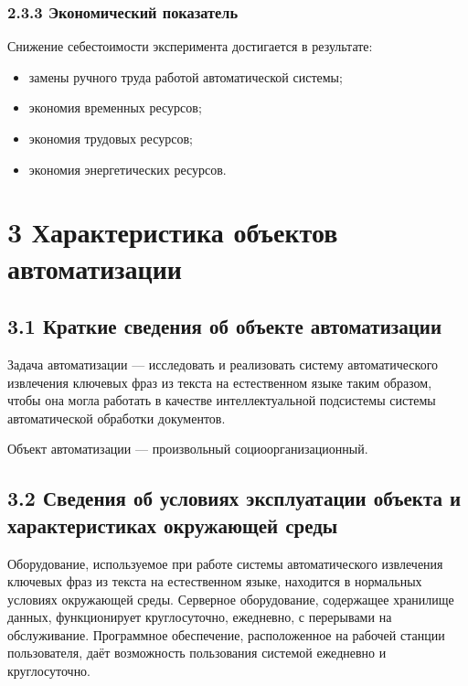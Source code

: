 \subsubsection*{2.3.3 Экономический показатель}
Снижение себестоимости эксперимента достигается в результате: 
\begin{itemize}
  \item замены ручного труда работой автоматической системы;
  \item экономия временных ресурсов;
  \item экономия трудовых ресурсов;
  \item экономия энергетических ресурсов.
\end{itemize}

\section*{3 Характеристика объектов автоматизации}
\subsection*{3.1 Краткие сведения об объекте автоматизации}
Задача автоматизации — исследовать и реализовать систему автоматического
извлечения ключевых фраз из текста на естественном языке таким образом,
чтобы она могла работать в качестве интеллектуальной подсистемы системы
автоматической обработки документов.

Объект автоматизации — произвольный социоорганизационный.

\subsection*{3.2 Сведения об условиях эксплуатации объекта и характеристиках окружающей среды}
Оборудование, используемое при работе системы автоматического извлечения
ключевых фраз из текста на естественном языке, находится в
нормальных условиях окружающей среды. Серверное оборудование, содержащее
хранилище данных, функционирует круглосуточно, ежедневно, с перерывами на
обслуживание. Программное обеспечение, расположенное на рабочей станции
пользователя, даёт возможность пользования системой ежедневно и
круглосуточно.


